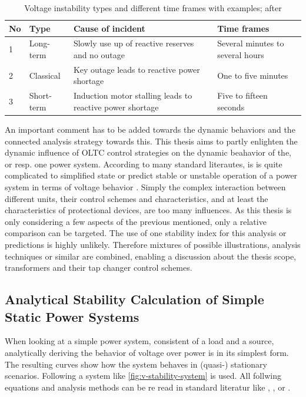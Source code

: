\begin{table}
    \centering
    \caption[Voltage instability types and different time frames]{Voltage instability types and different time frames with examples; after \quelle}
    \small
    \renewcommand\tabularxcolumn[1]{m{#1}}
    \vspace*{12pt}
    \begin{tabularx}{\textwidth}{llXX}
        \textbf{No} & \textbf{Type} & \textbf{Cause of incident} & \textbf{Time frames} \\
        \toprule
        1 & Long-term & Slowly use up of reactive reserves and no outage & Several minutes to several hours \\
        2 & Classical & Key outage leads to reactive power shortage & One to five minutes \\
        3 & Short-term & Induction motor stalling leads to reactive power shortage & Five to fifteen seconds \\
        \bottomrule
    \end{tabularx}
\end{table}

An important comment has to be added towards the dynamic behaviors and the connected analysis strategy towards this.
This thesis aims to partly enlighten the dynamic influence of \acs{OLTC} control strategies on the dynamic beahavior of the, or resp. one power system.
According to many standard literautes, is is quite complicated to simplified state or predict stable or unstable operation of a power system in terms of voltage behavior \autocite{machowski_2020}.
Simply the complex interaction between different units, their control schemes and characteristics, and at least the characteristics of protectional devices, are too many influences.
As this thesis is only considering a few aspects of the previous mentioned, only a relative comparison can be targeted.
The use of one stability index for this analysis or predictions is highly unlikely.
Therefore mixtures of possible illustrations, analysis techniques or similar are combined, enabling a discussion about the thesis scope, transformers and their tap changer control schemes.  
        
\subsection{Analytical Stability Calculation of Simple Static Power Systems}
\label{sec:analytical-voltage-stability}

When looking at a simple power system, consistent of a load and a source, analytically deriving the behavior of voltage over power is in its simplest form.
The resulting curves show how the system behaves in (quasi-) stationary scenarios.
Following a system like \autoref{fig:v-stability-system} is used. 
All follwing equations and analysis methods can be re read in standard literatur like \textcite{machowski_2020}, \textcite{kundur_2022}, or \autocite{cutsem_1998}. 

